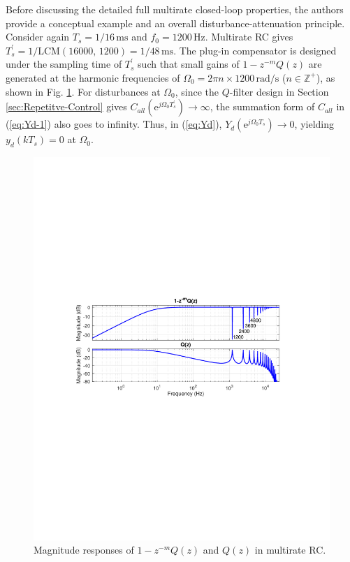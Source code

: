 \documentclass [11pt, proquest] {uwthesis}[2020/02/24]
\begin{document}
Before discussing the detailed full multirate closed-loop properties,
the authors provide a conceptual example and an overall disturbance-attenuation
principle. Consider again $T_{s}=1/16\,\text{ms}$ and $f_{0}=1200\,\text{Hz}$.
Multirate RC gives $T_{s}^{'}=\text{1/LCM}(16000,\,1200)=1/48\,\text{ms}$.
The plug-in compensator is designed under the sampling time of $T_{s}^{'}$
such that small gains of $1-z^{-m}Q(z)$ are generated at the harmonic
frequencies of $\Omega_{0}=2\pi n\times1200\,\text{rad/s}$ ($n\in\mathbb{Z}^{+}$),
as shown in Fig. \ref{fig:Q_multirate}. For disturbances at $\Omega_{0}$,
since the $Q$-filter design in Section \ref{sec:Repetitve-Control} gives
$C_{all}(\text{e}^{j\Omega_{0}T_{s}^{'}})\rightarrow\infty$, the
summation form of $C_{all}$ in (\ref{eq:Yd-1}) also goes to infinity.
Thus, in (\ref{eq:Yd}), $Y_{d}(\text{e}^{j\Omega_{0}T_{s}})\rightarrow0$,
yielding $y_{d}(kT_{s})=0$ at $\Omega_{0}$.
\begin{figure}[!ht]
\begin{centering}
\includegraphics[width=13cm]{Fractional-order-RC/Q_multirate_RC}
\par\end{centering}
\caption{\label{fig:Q_multirate}Magnitude responses of $1-z^{-m}Q(z)$ and
$Q(z)$ in multirate RC.}
\end{figure}
\end{document}

